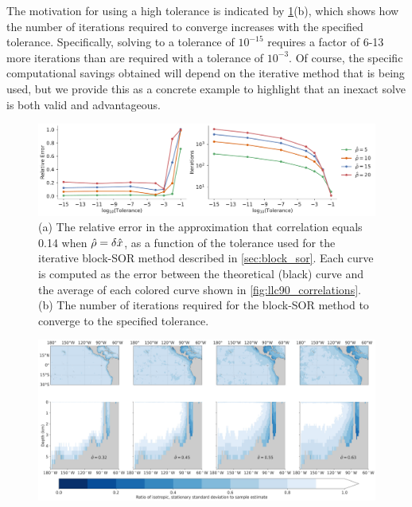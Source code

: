 The motivation for using a high tolerance is indicated by
\cref{fig:error_and_iters}(b), which shows how the number of iterations required
to converge increases with the specified tolerance.
Specifically, solving to a tolerance of $10^{-15}$ requires a factor of 6-13
more iterations than are required with a tolerance of $10^{-3}$.
Of course, the specific computational savings obtained will depend on the
iterative method that is being used, but we provide this as a concrete example
to highlight that an inexact solve is both valid and advantageous.

\begin{figure}
    \centering
    \includegraphics[width=\textwidth]{../figures/matern_llc90_error_and_iters.pdf}
    \caption{(a) The relative error in the approximation that correlation equals
        0.14 when $\hat{\rho}=\delta\hat{x}$, as a function of the tolerance used
        for the iterative block-SOR method described in \cref{sec:block_sor}.
        Each curve is computed as the error between the theoretical (black)
        curve and the average of each colored curve shown in \cref{fig:llc90_correlations}.
        (b) The number of iterations required for the block-SOR method to
        converge to the specified tolerance.
    }
    \label{fig:error_and_iters}
\end{figure}

\begin{figure}
    \centering
    \includegraphics[width=\textwidth]{../figures/normalization_factor.jpg}
\end{figure}
